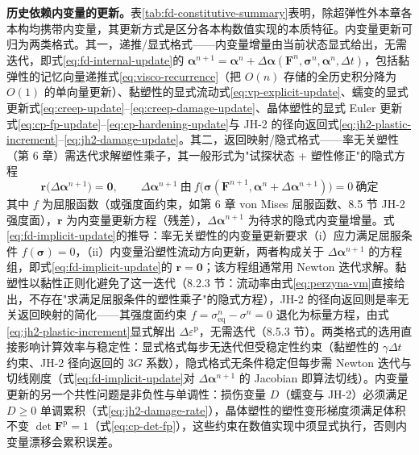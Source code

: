 \textbf{历史依赖内变量的更新。}表\ref{tab:fd-constitutive-summary}表明，除超弹性外本章各本构均携带内变量，其更新方式是区分各本构数值实现的本质特征。内变量更新可归为两类格式。其一，递推/显式格式——内变量增量由当前状态显式给出，无需迭代，即式\eqref{eq:fd-internal-update}的 $\boldsymbol{\alpha}^{n+1}=\boldsymbol{\alpha}^{n}+\Delta\boldsymbol{\alpha}(\mathbf{F}^{n},\boldsymbol{\sigma}^{n},\boldsymbol{\alpha}^{n},\Delta t)$，包括黏弹性的记忆向量递推式\eqref{eq:visco-recurrence}（把 $O(n)$ 存储的全历史积分降为 $O(1)$ 的单向量更新）、黏塑性的显式流动式\eqref{eq:vp-explicit-update}、蠕变的显式更新式\eqref{eq:creep-update}--\eqref{eq:creep-damage-update}、晶体塑性的显式 Euler 更新式\eqref{eq:cp-fp-update}--\eqref{eq:cp-hardening-update}与 JH-2 的径向返回式\eqref{eq:jh2-plastic-increment}--\eqref{eq:jh2-damage-update}。其二，返回映射/隐式格式——率无关塑性（第 6 章）需迭代求解塑性乘子，其一般形式为"试探状态 + 塑性修正"的隐式方程
\begin{equation}
  \mathbf{r}\bigl(\Delta\boldsymbol{\alpha}^{n+1}\bigr)
  =\mathbf{0},\qquad
  \Delta\boldsymbol{\alpha}^{n+1}\ \text{由}\ 
  f\bigl(\boldsymbol{\sigma}(\mathbf{F}^{n+1},\boldsymbol{\alpha}^{n}+\Delta\boldsymbol{\alpha}^{n+1})\bigr)=0
  \ \text{确定}
  \label{eq:fd-implicit-update}
\end{equation}
其中 $f$ 为屈服函数（或强度面约束，如第 6 章 von Mises 屈服函数、8.5 节 JH-2 强度面），$\mathbf{r}$ 为内变量更新方程（残差），$\Delta\boldsymbol{\alpha}^{n+1}$ 为待求的隐式内变量增量。式\eqref{eq:fd-implicit-update}的推导：率无关塑性的内变量更新要求（i）应力满足屈服条件 $f(\boldsymbol{\sigma})=0$，（ii）内变量沿塑性流动方向更新，两者构成关于 $\Delta\boldsymbol{\alpha}^{n+1}$ 的方程组，即式\eqref{eq:fd-implicit-update}的 $\mathbf{r}=\mathbf{0}$；该方程组通常用 Newton 迭代求解。黏塑性以黏性正则化避免了这一迭代（8.2.3 节：流动率由式\eqref{eq:perzyna-vm}直接给出，不存在"求满足屈服条件的塑性乘子"的隐式方程），JH-2 的径向返回则是率无关返回映射的简化——其强度面约束 $f=\sigma^{n}_{\mathrm{eq}}-\sigma^{n}=0$ 退化为标量方程，由式\eqref{eq:jh2-plastic-increment}显式解出 $\Delta\varepsilon^{\mathrm{p}}$，无需迭代（8.5.3 节）。两类格式的选用直接影响计算效率与稳定性：显式格式每步无迭代但受稳定性约束（黏塑性的 $\gamma\Delta t$ 约束、JH-2 径向返回的 $3G$ 系数），隐式格式无条件稳定但每步需 Newton 迭代与切线刚度（式\eqref{eq:fd-implicit-update}对 $\Delta\boldsymbol{\alpha}^{n+1}$ 的 Jacobian 即算法切线）\cite{Foster2010,SimoHughes1998}。内变量更新的另一个共性问题是非负性与单调性：损伤变量 $D$（蠕变与 JH-2）必须满足 $D\ge0$ 单调累积（式\eqref{eq:jh2-damage-rate}），晶体塑性的塑性变形梯度须满足体积不变 $\det\mathbf{F}^{\mathrm{p}}=1$（式\eqref{eq:cp-det-fp}），这些约束在数值实现中须显式执行，否则内变量漂移会累积误差。


